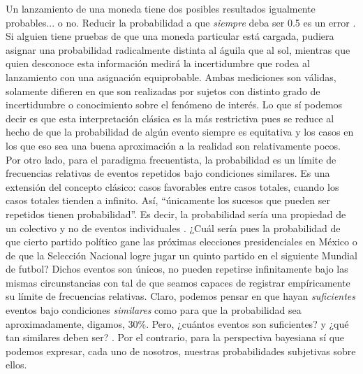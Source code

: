 Un lanzamiento de una moneda tiene dos posibles resultados igualmente probables... o no. Reducir la probabilidad a que \textit{siempre} deba ser 0.5 es un error \parencite{Nozer17}. Si alguien tiene pruebas de que una moneda particular está cargada, pudiera asignar una probabilidad radicalmente distinta al águila que al sol, mientras que quien desconoce esta información medirá la incertidumbre que rodea al lanzamiento con una asignación equiprobable. Ambas mediciones son válidas, solamente difieren en que son realizadas por sujetos con distinto grado de incertidumbre o conocimiento sobre el fenómeno de interés. Lo que sí podemos decir es que esta interpretación clásica es la más restrictiva pues se reduce al hecho de que la probabilidad de algún evento siempre es equitativa y los casos en los que eso sea una buena aproximación a la realidad son relativamente pocos.\\	 
	 
Por otro lado, para el paradigma frecuentista, la probabilidad es un límite de frecuencias relativas de eventos repetidos bajo condiciones similares. Es una extensión del concepto clásico: casos favorables entre casos totales, cuando los casos totales tienden a infinito. Así, ``únicamente los sucesos que pueden ser repetidos tienen probabilidad''\parencite{Aquino10}. Es decir, la probabilidad sería una propiedad de un colectivo  y no de eventos individuales \parencite{Nozer17}. ¿Cuál sería pues la probabilidad de que cierto partido político gane las próximas elecciones presidenciales en México o de que la Selección Nacional logre jugar un quinto partido en el siguiente Mundial de futbol? Dichos eventos son únicos, no pueden repetirse infinitamente bajo las mismas circunstancias con tal de que seamos capaces de registrar empíricamente su límite de frecuencias relativas. Claro, podemos pensar en que hayan \textit{suficientes} eventos bajo condiciones \textit{similares} como para que la probabilidad sea aproximadamente, digamos, 30\%. Pero, ¿cuántos eventos son suficientes? y ¿qué tan similares deben ser? \parencite{Nozer17}. Por el contrario, para la perspectiva bayesiana sí que podemos expresar, cada uno de nosotros, nuestras probabilidades subjetivas sobre ellos.\\ 
	
